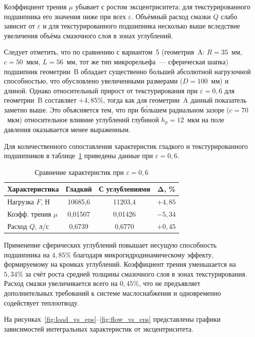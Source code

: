 Коэффициент трения $\mu$ убывает с ростом эксцентриситета; для текстурированного подшипника его значения ниже при всех $\varepsilon$. Объёмный расход смазки $Q$ слабо зависит от $\varepsilon$ и для текстурированного подшипника несколько выше вследствие увеличения объёма смазочного слоя в зонах углублений.

Следует отметить, что по сравнению с вариантом~5 (геометрия~A: $R = 35$~мм, $c = 50$~мкм, $L = 56$~мм, тот же тип микрорельефа~--- сферическая шапка) подшипник геометрии~B обладает существенно большей абсолютной нагрузочной способностью, что обусловлено увеличенными размерами ($D = 100$~мм) и длиной. Однако относительный прирост от текстурирования при $\varepsilon = 0{,}6$ для геометрии~B составляет $+4{,}85$\%, тогда как для геометрии~A данный показатель заметно выше. Это объясняется тем, что при бо́льшем радиальном зазоре ($c = 70$~мкм) относительное влияние углублений глубиной $h_p = 12$~мкм на поле давления оказывается менее выраженным.

Для количественного сопоставления характеристик гладкого и текстурированного подшипников в таблице~\ref{tab:comparison} приведены данные при $\varepsilon = 0{,}6$.

\begin{table}[H]
\small
\centering
\caption{Сравнение характеристик при $\varepsilon = 0{,}6$}
\label{tab:comparison}
\begin{tabular}{|l|c|c|c|}
\hline
\textbf{Характеристика} & \textbf{Гладкий} & \textbf{С углублениями} & $\boldsymbol{\Delta}$\textbf{, \%} \\
\hline
Нагрузка $F$, Н & 10685{,}6 & 11203{,}4 & $+4{,}85$ \\
\hline
Коэфф. трения $\mu$ & 0{,}01507 & 0{,}01426 & $-5{,}34$ \\
\hline
Расход $Q$, л/с & 0{,}6739 & 0{,}6770 & $+0{,}45$ \\
\hline
\end{tabular}
\end{table}

Применение сферических углублений повышает несущую способность подшипника на $4{,}85$\% благодаря микрогидродинамическому эффекту, формируемому на кромках углублений. Коэффициент трения уменьшается на $5{,}34$\% за счёт роста средней толщины смазочного слоя в зонах текстурирования. Расход смазки увеличивается всего на $0{,}45$\%, что не предъявляет дополнительных требований к системе маслоснабжения и одновременно содействует теплоотводу.

На рисунках~\ref{fig:load_vs_eps}--\ref{fig:flow_vs_eps} представлены графики зависимостей интегральных характеристик от эксцентриситета.

